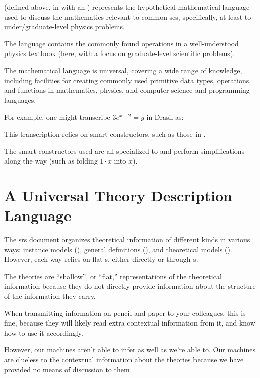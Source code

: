 \originalExprHaskell




\Expr{} (defined above, in  with an )
represents the hypothetical mathematical language used to discuss the
mathematics relevant to common \acs{scs}, specifically, at least to
under/graduate-level physics problems.

The language contains the commonly found operations in a well-understood physics
textbook (here, with a focus on graduate-level scientific problems).

The mathematical language is universal, covering a wide range of knowledge,
including facilities for creating commonly used primitive data types,
operations, and functions  in mathematics, physics, and computer science and
programming languages.

For example, one might transcribe \(3 e^{x + 2} = y\) in Drasil as:

\pseudoExampleExpression{}

This transcription relies on smart constructors, such as those in
.

The smart constructors used are all specialized to \Expr{} and perform
simplifications along the way (such as folding \(1 \cdot x\) into \(x\)).




\section{A Universal Theory Description Language}



The \acs{srs} document organizes theoretical information of different kinds in
various ways: instance models (\InstanceModel{}), general definitions
(\GenDefn{}), and theoretical models (\TheoryModel{}). However, each way relies
on flat \Relation{}s, either directly or through \RelationConcept{}s.

The theories are ``shallow'', or ``flat,'' representations of the theoretical
information because they do not directly provide information about the structure
of the information they carry.

When transmitting information on pencil and paper to your colleagues, this is
fine, because they will likely read extra contextual information from it, and
know how to use it accordingly.

However, our machines aren't able to infer as well as we're able to. Our
machines are clueless to the contextual information about the theories because
we have provided no means of discussion to them.

